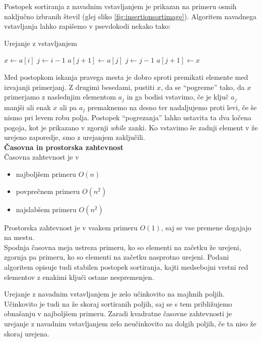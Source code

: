 \documentclass[a4paper,oneside]{article}
\begin{document}
Postopek sortiranja z navadnim vstavljanjem je prikazan na primeru osmih naključno
izbranih števil (glej sliko \ref{fig:insertionsortimage}). Algoritem navadnega
vstavljanja lahko zapišemo v psevdokodi nekako tako:

\begin{algorithm}
  \caption{Urejanje z vstavljanjem}\label{algo:insertionsort}
  \begin{algorithmic}[1]
            \State $x \gets a[i]$
            \State $j \gets i - 1$
                \State $a[j+1] \gets a[j]$
                \State $j \gets j - 1$
            \EndWhile
            \State $a[j+1] \gets x$
        \EndFor
    \EndFunction
  \end{algorithmic}
\end{algorithm}

Med postopkom iskanja pravega mesta je dobro sproti premikati elemente med izvajanji
primerjanj. Z drugimi besedami, pustiti $x$, da se ``pogrezne'' tako, da $x$
primerjamo z naslednjim elementom $a_j$ in ga bodisi vstavimo, če je ključ $a_j$ manjši
ali enak $x$ ali pa $a_j$ premaknemo na desno ter nadaljujemo proti levi, če še nismo pri
levem robu polja. Postopek ``pogrezanja'' lahko ustavita ta dva ločena
pogoja, kot je prikazano v zgornji \emph{while} zanki.  Ko vstavimo še zadnji element v že 
urejeno zaporedje, smo z urejanjem zaključili.\\

\textbf{Časovna in prostorska zahtevnost} \\
Časovna zahtevnost je v 
\begin{itemize}
  \item najboljšem primeru $O(n)$
  \item povprečnem primeru $O(n^2)$
  \item najslabšem primeru $O(n^2)$
\end{itemize}

Prostorska zahtevnost je v vsakem primeru $O(1)$, saj se vse premene dogajajo na
mestu.\\

Spodnja časovna meja ustreza primeru, ko so elementi na začetku že urejeni, zgornja pa primeru,
ko so elementi na začetku nasprotno urejeni. Podani algoritem opisuje tudi stabilen postopek sortiranja, kajti medsebojni
vrstni red elementov z enakimi ključi ostane nespremenjen.

Urejanje z navadnim vstavljanjem je zelo učinkovito na majhnih poljih. Učinkovito je tudi na že
skoraj sortiranih poljih, saj se s tem približujemo obnašanju v najboljšem primeru.
Zaradi kvadratne časovne zahtevnosti je urejanje z navadnim vstavljanjem zelo neučinkovito na
dolgih poljih, če ta niso že skoraj urejena.
\end{document}
